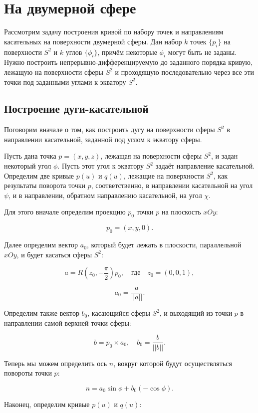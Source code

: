 \section{На двумерной сфере}

Рассмотрим задачу построения кривой по набору точек и направлениям касательных на поверхности двумерной сферы.
Дан набор $k$ точек $\{p_i\}$ на поверхности $S^2$ и $k$ углов $\{\phi_i\}$, причём некоторые $\phi_i$ могут быть
не заданы. Нужно построить непрерывно-дифференцируемую до заданного порядка кривую, лежащую на поверхности сферы $S^2$ и
проходящую последовательно через все эти точки под заданными углами к экватору $S^2$.

\subsection*{Построение дуги-касательной}

Поговорим вначале о том, как построить дугу на поверхности сферы $S^2$ в направлении касательной, заданной под углом к
экватору сферы.

Пусть дана точка $p=(x,y,z)$, лежащая на поверхности сферы $S^2$, и задан некоторый угол $\phi$. Пусть этот угол к
экватору $S^2$ задаёт направление касательной. Определим две кривые $p(u)$ и $q(u)$, лежащие на поверхности $S^2$,
как результаты поворота точки $p$, соответственно, в направлении касательной на угол $\psi$, и в направлении,
обратном направлению касательной, на угол $\chi$.

Для этого вначале определим проекцию $p_0$ точки $p$ на плоскость $xOy$:

$$
p_0=(x,y,0).
$$

Далее определим вектор $a_0$, который будет лежать в плоскости, параллельной $xOy$, и будет касаться сферы $S^2$:

$$
a=R(z_0,-\frac{\pi}{2})p_0, \quad \text{где} \quad z_0=(0,0,1),
$$

$$
a_0=\frac{a}{||a||}.
$$

Определим также вектор $b_0$, касающийся сферы $S^2$, и выходящий из точки $p$ в направлении самой верхней точки сферы:

$$
b=p_0 \times a_0, \quad b_0=\frac{b}{||b||}.
$$

Теперь мы можем определить ось $n$, вокруг которой будут осуществляться повороты точки $p$:

$$
n=a_0\sin\phi+b_0(-\cos\phi).
$$

Наконец, определим кривые $p(u)$ и $q(u)$:

